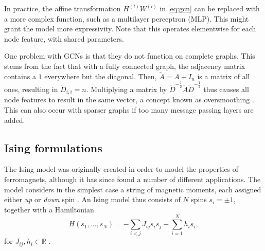 In practice, the affine transformation $H^{(l)} W^{(l)}$ in \eqref{eq:gcn} can be replaced with a more complex function, such as a multilayer perceptron (MLP).
This might grant the model more expressivity.
Note that this operates elementwise for each node feature, with shared parameters.

One problem with GCNs is that they do not function on complete graphs.
This stems from the fact that with a fully connected graph, the adjacency matrix contains a $1$ everywhere but the diagonal.
Then, $\tilde{A} = A + I_n$ is a matrix of all ones, resulting in $\tilde{D}_{i,i} = n$.
Multiplying a matrix by $\tilde{D}^{-\frac{1}{2}} \tilde{A} \tilde{D}^{-\frac{1}{2}}$ thus causes all node features to result in the same vector, a concept known as oversmoothing \cite{oversmoothing}.
This can also occur with sparser graphs if too many message passing layers are added.

\subsection{Ising formulations}
The Ising model was originally created in order to model the properties of ferromagnets, although it has since found a number of different applications.
The model considers in the simplest case a string of magnetic moments, each assigned either \textit{up} or \textit{down} spin \cite{isingModel}.
An Ising model thus consists of $N$ spins $s_i = \pm 1$, together with a Hamiltonian
\begin{equation}\label{eq:hamiltonian}
    H(s_1, \ldots, s_N) = - \sum_{i < j} J_{ij} s_i s_j - \sum_{i = 1}^N h_i s_i,
\end{equation}
for $J_{ij}, h_i \in \mathbb{R}$ \cite{IsingFormulations}.


